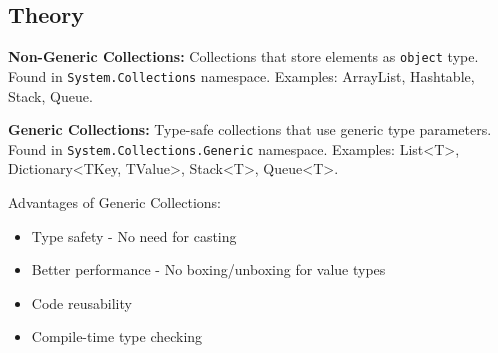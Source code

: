 \documentclass[10pt,a4paper]{article}
\begin{document}
\subsection*{Theory}
\textbf{Non-Generic Collections:} Collections that store elements as \texttt{object} type. Found in \texttt{System.Collections} namespace. Examples: ArrayList, Hashtable, Stack, Queue.

\textbf{Generic Collections:} Type-safe collections that use generic type parameters. Found in \texttt{System.Collections.Generic} namespace. Examples: List<T>, Dictionary<TKey, TValue>, Stack<T>, Queue<T>.

Advantages of Generic Collections:
\begin{itemize}
    \item Type safety - No need for casting
    \item Better performance - No boxing/unboxing for value types
    \item Code reusability
    \item Compile-time type checking
\end{itemize}
\end{document}

